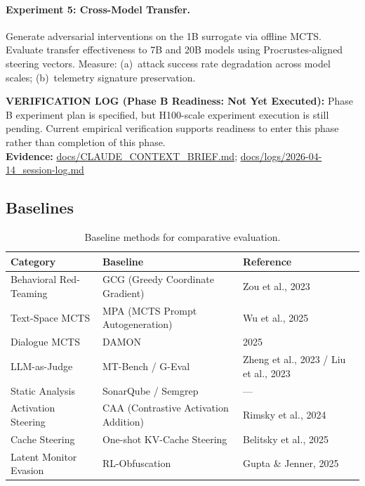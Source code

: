 \documentclass[10pt]{article}
\newcommand{\verifybox}[3]{%
\vspace{0.6em}
\noindent\colorbox{yellow!20}{%
\parbox{\dimexpr\linewidth-2\fboxsep\relax}{%
\textbf{VERIFICATION LOG (#1):} #2\\
\textbf{Evidence:} #3
}}%
\vspace{0.6em}
}
\begin{document}
\paragraph{Experiment 5: Cross-Model Transfer.}
Generate adversarial interventions on the 1B surrogate via offline MCTS. Evaluate transfer effectiveness to 7B and 20B models using Procrustes-aligned steering vectors. Measure: (a)~attack success rate degradation across model scales; (b)~telemetry signature preservation.

\verifybox
{Phase B Readiness: Not Yet Executed}
{Phase B experiment plan is specified, but H100-scale experiment execution is still pending. Current empirical verification supports readiness to enter this phase rather than completion of this phase.}
{\url{docs/CLAUDE_CONTEXT_BRIEF.md}; \url{docs/logs/2026-04-14_session-log.md}}

\subsection{Baselines}


\begin{table}[h]
\centering
\begin{tabular}{@{}lll@{}}
\toprule
\textbf{Category} & \textbf{Baseline} & \textbf{Reference} \\
\midrule
Behavioral Red-Teaming & GCG (Greedy Coordinate Gradient) & Zou et al., 2023 \\
Text-Space MCTS & MPA (MCTS Prompt Autogeneration) & Wu et al., 2025 \\
Dialogue MCTS & DAMON & 2025 \\
LLM-as-Judge & MT-Bench / G-Eval & Zheng et al., 2023 / Liu et al., 2023 \\
Static Analysis & SonarQube / Semgrep & --- \\
Activation Steering & CAA (Contrastive Activation Addition) & Rimsky et al., 2024 \\
Cache Steering & One-shot KV-Cache Steering & Belitsky et al., 2025 \\
Latent Monitor Evasion & RL-Obfuscation & Gupta \& Jenner, 2025 \\
\bottomrule
\end{tabular}
\caption{Baseline methods for comparative evaluation.}
\label{tab:baselines}
\end{table}
\end{document}
